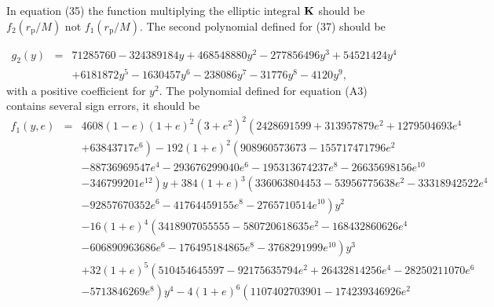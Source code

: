 \documentclass[aps,prd,amsfonts,amssymb,amsmath,nofootinbib,reprint,showpacs]{revtex4-1}
\newcommand{\sub}[1]{\ensuremath{_\text{#1}}}
\begin{document}
In equation (35) the function multiplying the elliptic integral ${\bf{K}}$ should be $f_2(r\sub{p}/M)$ not $f_1(r\sub{p}/M)$.
The second polynomial defined for (37) should be
\begin{widetext}
\begin{eqnarray}
g_2(y) & = & 71285760-324389184 y+468548880 y^2-277856496 y^3+54521424 y^4 \nonumber \\
 & & + \left. 6181872 y^5-1630457 y^6-238086 y^7-31776 y^8-4120 y^9\right.,
\end{eqnarray}
with a positive coefficient for $y^2$. The polynomial defined for equation (A3) contains several sign errors, it should be
\begin{eqnarray}
f_1(y,e) & = & 4608 (1-e) (1+e)^2 \left(3+e^2\right)^2 \left(2428691599+313957879 e^2+1279504693 e^4 \right.\nonumber \\
 & & + \left. 63843717 e^6\right)-192 (1+e)^2 \left(908960573673-155717471796 e^2 \right.\nonumber \\
 & & - \left. 88736969547 e^4-293676299040 e^6-195313674237 e^8-26635698156 e^{10} \right. \nonumber \\
 & & - \left. 346799201 e^{12}\right) y+384 (1+e)^3 \left(336063804453-53956775638 e^2-33318942522 e^4 \right. \nonumber \\
 & & - \left. 92857670352 e^6-41764459155 e^8-2765710514 e^{10}\right) y^2 \nonumber \\
 & & - \left. 16 (1+e)^4 \left(3418907055555-580720618635 e^2-168432860626 e^4 \right.\right. \nonumber \\
 & & - \left. 606890963686 e^6-176495184865 e^8-3768291999 e^{10}\right) y^3 \nonumber \\
 & & + \left. 32 (1+e)^5 \left(510454645597-92175635794 e^2+26432814256 e^4-28250211070 e^6 \right.\right. \nonumber \\
 & & - \left. 5713846269 e^8\right) y^4-4 (1+e)^6 \left(1107402703901-174239346926 e^2 \right. \nonumber \\

\end{eqnarray}
\end{widetext}
\end{document}
